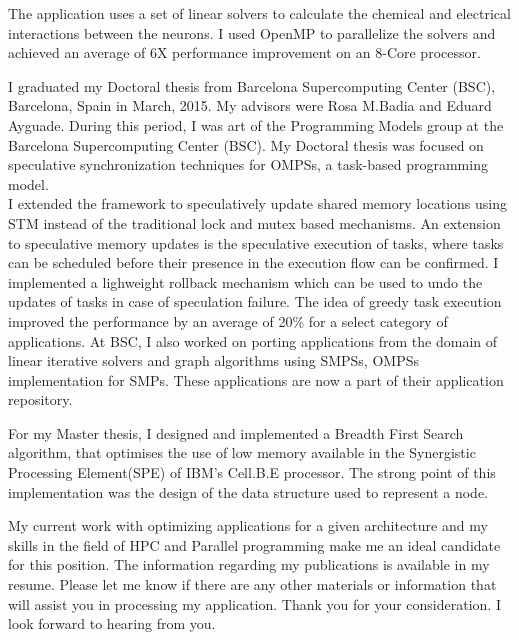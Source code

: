 \documentclass[10pt,stdletter,dateno]{newlfm}
\begin{document}
\begin{newlfm}
    The application uses a set of linear solvers to calculate the chemical and electrical interactions between the neurons.
    I used OpenMP to parallelize the solvers and achieved an average of 6X performance improvement on an 8-Core processor.
%
    \par
    I graduated my Doctoral thesis from Barcelona Supercomputing Center (BSC), Barcelona, Spain in March, 2015.
    My advisors were Rosa M.Badia and Eduard Ayguade.
    During this period, I was art of the Programming Models group at the Barcelona Supercomputing Center (BSC).
    My Doctoral thesis was focused on speculative synchronization techniques for OMPSs, a task-based programming model.\\
%
    I extended the framework to speculatively update shared memory locations using STM instead of the traditional lock and mutex based mechanisms.
    An extension to speculative memory updates is the speculative execution of tasks, where tasks can be scheduled before their presence in the execution flow can be confirmed.
    I implemented a lighweight rollback mechanism which can be used to undo the updates of tasks in case of speculation failure.
    The idea of greedy task execution improved the performance by an average of 20\% for a select category of applications.
    At BSC, I also worked on porting applications from the domain of linear iterative solvers and graph algorithms using SMPSs, OMPSs implementation for SMPs.
    These applications are now a part of their application repository.
%
    \par
    For my Master thesis, I designed and implemented a Breadth First Search algorithm, that optimises the use of low memory available in the Synergistic Processing Element(SPE) of IBM's Cell.B.E processor.
    The strong point of this implementation was the design of the data structure used to represent a node.
%
	\par
    My current work with optimizing applications for a given architecture and my skills in the field of HPC and Parallel programming make me an ideal candidate for this position.
    The information regarding my publications is available in my resume.
    Please let me know if there are any other materials or information that will assist you in processing my application.
    Thank you for your consideration. I look forward to hearing from you.


\end{newlfm}
\end{document}
